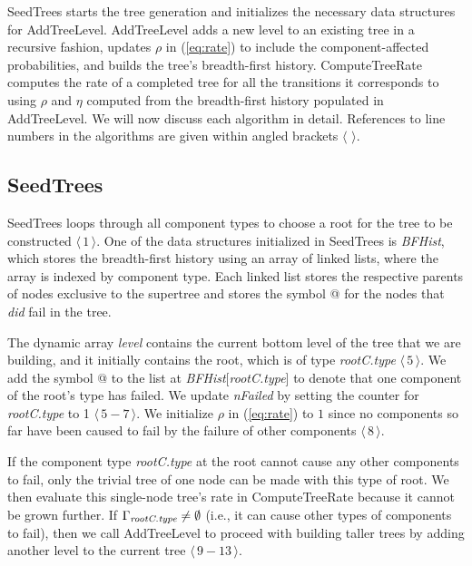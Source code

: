 \documentclass[12pt]{article}
\newcommand{\varName}[1]{\textrm{\it#1}}
\newcommand{\citeLine}[1]{$\langle \, #1 \, \rangle$}
\newcommand{\citeBlock}[2]{$\langle \, #1 - #2 \, \rangle$}
\begin{document}
SeedTrees starts the tree generation and initializes the necessary data structures for \mbox{AddTreeLevel}. \mbox{AddTreeLevel} adds a new level to an existing tree in a recursive fashion, updates $\rho$ in (\ref{eq:rate}) to include the component-affected probabilities, and builds the tree's breadth-first history. ComputeTreeRate computes the rate of a completed tree for all the transitions it corresponds to using $\rho$ and $\eta$ computed from the breadth-first history populated in \mbox{AddTreeLevel}. We will now discuss each algorithm in detail. References to line numbers in the algorithms are given within angled brackets \citeLine{}.

\subsection{SeedTrees}
\label{sec:seedtrees}

SeedTrees loops through all component types to choose a root for the tree to be constructed \citeLine{1}. One of the data structures initialized in SeedTrees is \varName{BFHist}, which stores the breadth-first history using an array of linked lists, where the array is indexed by component type. Each linked list stores the respective parents of nodes exclusive to the supertree and stores the symbol @ for the nodes that \textit{did} fail in the tree.

The dynamic array \varName{level} contains the current bottom level of the tree that we are building, and it initially contains the root, which is of type \varName{rootC.type} \citeLine{5}. We add the symbol @ to the list at \varName{BFHist}[\varName{rootC.type}] to denote that one component of the root's type has failed. We update \varName{nFailed} by setting the counter for \varName{rootC.type} to 1 \citeBlock{5}{7}. We initialize $\rho$ in (\ref{eq:rate}) to $1$ since no components so far have been caused to fail by the failure of other components \citeLine{8}.

If the component type \varName{rootC.type} at the root cannot cause any other components to fail, only the trivial tree of one node can be made with this type of root. We then evaluate this single-node tree's rate in ComputeTreeRate because it cannot be grown further. If $\Gamma_{\varName{rootC.type}} \neq \emptyset$ (i.e., it can cause other types of components to fail), then we call \mbox{AddTreeLevel} to proceed with building taller trees by adding another level to the current tree \citeBlock{9}{13}.
\end{document}
